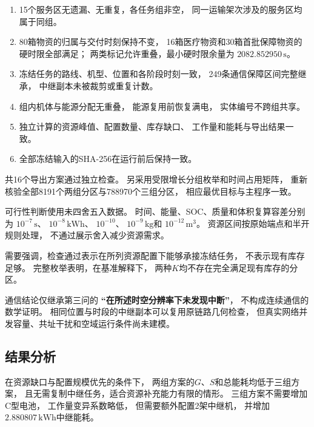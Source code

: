 \documentclass[bwprint]{gmcmthesis}
\begin{document}
\begin{enumerate}
    \item 15个服务区无遗漏、无重复，各任务组非空，
    同一运输架次涉及的服务区均属于同组。

    \item 80箱物资的归属与交付时刻保持不变，
    16箱医疗物资和30箱首批保障物资的硬时限全部满足；
    两类标记允许重叠，最小硬时限余量为
    $2082.852950\,\mathrm{s}$。

    \item 冻结任务的路线、机型、位置和各阶段时刻一致，
    249条通信保障区间完整继承，
    中继副本未被裁剪或重复计数。

    \item 组内机体与能源分配无重叠，
    能源复用前恢复满电，
    实体编号不跨组共享。

    \item 独立计算的资源峰值、配置数量、库存缺口、
    工作量和能耗与导出结果一致。

    \item 全部冻结输入的SHA-256在运行前后保持一致。
\end{enumerate}

共16个导出方案通过独立检查。
另采用受限增长分组枚举和时间占用矩阵，
重新核验全部8191个两组分区与788970个三组分区，
相应最优目标与主程序一致。

可行性判断使用未四舍五入数据。
时间、能量、SOC、质量和体积复算容差分别为
$10^{-7}\,\mathrm{s}$、
$10^{-8}\,\mathrm{kWh}$、
$10^{-10}$、
$10^{-9}\,\mathrm{kg}$和
$10^{-12}\,\mathrm{m}^3$。
资源区间按原始端点和半开规则处理，
不通过展示舍入减少资源需求。

需要强调，检查通过表示在所列资源配置下能够承接冻结任务，
不表示现有库存足够。
完整枚举表明，在基准解释下，
两种$K$均不存在完全满足现有库存的分区。

通信结论仅继承第三问的
\textbf{“在所述时空分辨率下未发现中断”}，
不构成连续通信的数学证明。
相同位置与时段的中继副本可以复用原链路几何检查，
但真实网络并发容量、共址干扰和空域运行条件尚未建模。

\subsection{结果分析}

在资源缺口与配置规模优先的条件下，
两组方案的$G$、$S$和总能耗均低于三组方案，
且无需复制中继任务，适合资源补充能力有限的情形。
三组方案不需要增加C型电池，
工作量变异系数略低，
但需要额外配置2架中继机，
并增加$2.880807\,\mathrm{kWh}$中继能耗。
\end{document}
